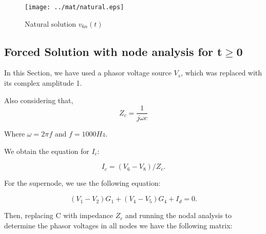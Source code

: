 \begin{figure}[H] \centering
\texttt{[image: ../mat/natural.eps]}
\caption{Natural solution $v_{6n} (t)$} 
\label{fig:mat3}
\end{figure}

\subsection{Forced Solution with node analysis for t$\geq$0}

In this Section, we have used a phasor voltage source $V_s$, which was replaced with its complex amplitude 1.

Also considering that,
\begin{equation}
     Z_c = \frac{1}{j\omega c}
\end{equation}\par
Where $\omega= 2\pi f$ and $f= 1000Hz$.\par

We obtain the equation for $I_c$:

\begin{equation}
  I_c=(V_6-V_8)/Z_c.
\end{equation}

For the supernode, we use the following equation:

\begin{equation}
  (V_1-V_2)G_1+(V_4-V_5)G_4+I_d=0.
\end{equation}


Then, replacing C with  impedance $Z_c$ and running the nodal analysis to determine the phasor voltages in all nodes we have the following matrix:\par

